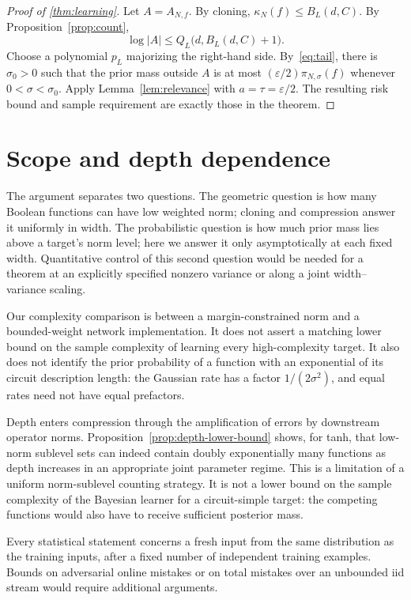 \documentclass[11pt]{article}
\theoremstyle{definition}
\begin{document}
\begin{proof}[Proof of \cref{thm:learning}]
Let $A=A_{N,f}$. By cloning, $\kappa_N(f)\leq B_L(d,C)$. By Proposition~\ref{prop:count},
\[
 \log|A|\leq Q_L\bigl(d,B_L(d,C)+1\bigr).
\]
Choose a polynomial $p_L$ majorizing the right-hand side. By~\eqref{eq:tail}, there is $\sigma_0>0$ such that the prior mass outside $A$ is at most $(\varepsilon/2)\pi_{N,\sigma}(f)$ whenever $0<\sigma<\sigma_0$. Apply Lemma~\ref{lem:relevance} with $a=\tau=\varepsilon/2$. The resulting risk bound and sample requirement are exactly those in the theorem.
\end{proof}



\section{Scope and depth dependence}
The argument separates two questions. The geometric question is how many Boolean functions can have low weighted norm; cloning and compression answer it uniformly in width. The probabilistic question is how much prior mass lies above a target's norm level; here we answer it only asymptotically at each fixed width. Quantitative control of this second question would be needed for a theorem at an explicitly specified nonzero variance or along a joint width--variance scaling.

Our complexity comparison is between a margin-constrained norm and a bounded-weight network implementation. It does not assert a matching lower bound on the sample complexity of learning every high-complexity target. It also does not identify the prior probability of a function with an exponential of its circuit description length: the Gaussian rate has a factor $1/(2\sigma^2)$, and equal rates need not have equal prefactors.

Depth enters compression through the amplification of errors by downstream operator norms. Proposition~\ref{prop:depth-lower-bound} shows, for tanh, that low-norm sublevel sets can indeed contain doubly exponentially many functions as depth increases in an appropriate joint parameter regime. This is a limitation of a uniform norm-sublevel counting strategy. It is not a lower bound on the sample complexity of the Bayesian learner for a circuit-simple target: the competing functions would also have to receive sufficient posterior mass.

Every statistical statement concerns a fresh input from the same distribution as the training inputs, after a fixed number of independent training examples. Bounds on adversarial online mistakes or on total mistakes over an unbounded iid stream would require additional arguments.
\end{document}
